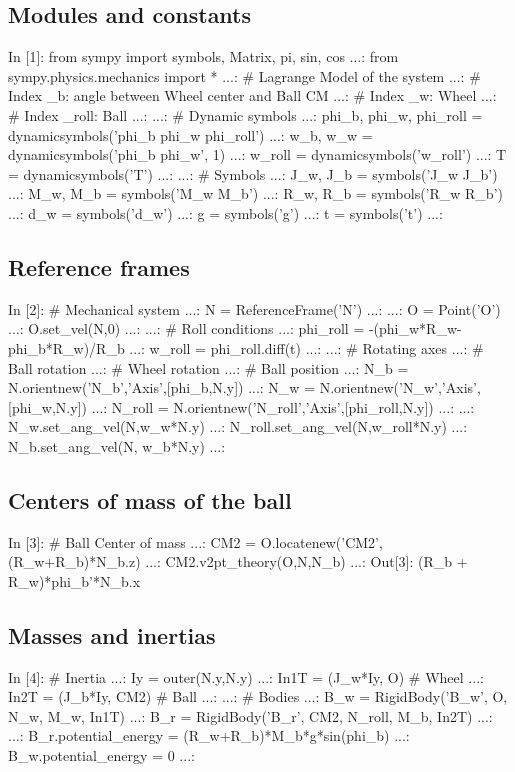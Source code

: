 \subsection{Modules and constants}
\begin{code}
In [1]: from sympy import symbols, Matrix, pi, sin, cos
   ...: from sympy.physics.mechanics import *
   ...: # Lagrange Model of the system
   ...: # Index _b: angle between Wheel center and Ball CM
   ...: # Index _w: Wheel
   ...: # Index _roll: Ball
   ...: 
   ...: # Dynamic symbols
   ...: phi_b, phi_w, phi_roll = dynamicsymbols('phi_b phi_w phi_roll')
   ...: w_b, w_w = dynamicsymbols('phi_b phi_w', 1)
   ...: w_roll = dynamicsymbols('w_roll')
   ...: T = dynamicsymbols('T')
   ...: 
   ...: # Symbols
   ...: J_w, J_b = symbols('J_w J_b')
   ...: M_w, M_b = symbols('M_w M_b')
   ...: R_w, R_b = symbols('R_w R_b')
   ...: d_w     = symbols('d_w')
   ...: g      = symbols('g')
   ...: t      = symbols('t')
   ...: 
\end{code}

\subsection{Reference frames}
\begin{code}
In [2]: # Mechanical system
   ...: N = ReferenceFrame('N')
   ...: 
   ...: O = Point('O')
   ...: O.set_vel(N,0)
   ...: 
   ...: # Roll conditions
   ...: phi_roll = -(phi_w*R_w-phi_b*R_w)/R_b
   ...: w_roll = phi_roll.diff(t)
   ...: 
   ...: # Rotating axes
   ...: # Ball rotation
   ...: # Wheel rotation
   ...: # Ball position
   ...: N_b = N.orientnew('N_b','Axis',[phi_b,N.y])
   ...: N_w = N.orientnew('N_w','Axis',[phi_w,N.y])
   ...: N_roll = N.orientnew('N_roll','Axis',[phi_roll,N.y])
   ...: 
   ...: N_w.set_ang_vel(N,w_w*N.y)
   ...: N_roll.set_ang_vel(N,w_roll*N.y)
   ...: N_b.set_ang_vel(N, w_b*N.y)
   ...: 
\end{code}

\subsection{Centers of mass of the ball}
\begin{code}
In [3]: # Ball Center of mass
   ...: CM2 = O.locatenew('CM2',(R_w+R_b)*N_b.z)
   ...: CM2.v2pt_theory(O,N,N_b)
   ...: 
Out[3]: (R_b + R_w)*phi_b'*N_b.x
\end{code}

\subsection{Masses and inertias}
\begin{code}
In [4]: # Inertia
   ...: Iy = outer(N.y,N.y)
   ...: In1T = (J_w*Iy, O)       # Wheel
   ...: In2T = (J_b*Iy, CM2)   # Ball
   ...: 
   ...: # Bodies
   ...: B_w = RigidBody('B_w', O, N_w, M_w, In1T)
   ...: B_r = RigidBody('B_r', CM2, N_roll, M_b, In2T)
   ...: 
   ...: B_r.potential_energy = (R_w+R_b)*M_b*g*sin(phi_b)
   ...: B_w.potential_energy = 0
   ...: 
\end{code}

